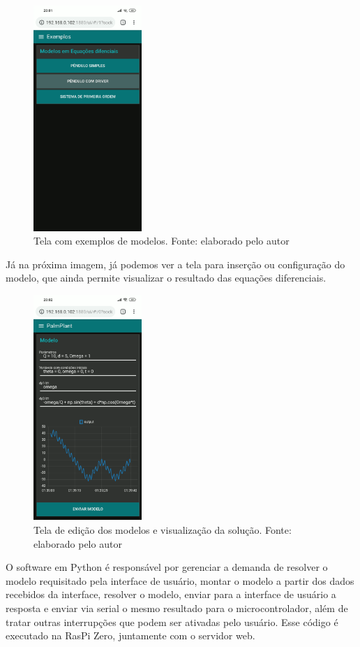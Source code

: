 \documentclass[journal]{IEEEtranTIE}
\begin{document}
\begin{figure}[H]
	\centering
	\includegraphics[width=4.1cm]{img/examples.png}
    \caption{Tela com exemplos de modelos. Fonte: elaborado pelo autor}
    \label{fig:examples}
\end{figure}

Já na próxima imagem, já podemos ver a tela para inserção ou configuração do modelo, que ainda permite visualizar o resultado das equações diferenciais.

\begin{figure}[H]
	\centering
	\includegraphics[width=4.1cm]{img/running.png}
    \caption{Tela de edição dos modelos e visualização da solução. Fonte: elaborado pelo autor}
    \label{fig:running}
\end{figure}

O software em Python é responsável por gerenciar a demanda de resolver o modelo requisitado pela interface de usuário, montar o modelo a partir dos dados recebidos da interface, resolver o modelo, enviar para a interface de usuário a resposta e enviar via serial o mesmo resultado para o microcontrolador, além de tratar outras interrupções que podem ser ativadas pelo usuário. Esse código é executado na RasPi Zero, juntamente com o servidor web.
\end{document}
